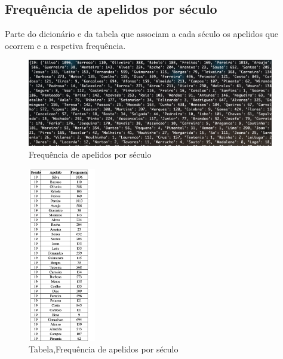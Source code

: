 \documentclass[a4paper, 12pt]{article}
\begin{document}
\subsection{Frequência de apelidos por século}
Parte do dicionário e da tabela que associam a cada século os apelidos que ocorrem e a respetiva frequência.
\begin{figure}[H]
    \centering
    \includegraphics[height=1.5in]{3.png}
    \caption{Frequência de apelidos por século}
    \label{fig:my_label}
\end{figure}
\begin{figure}[H]
    \centering
    \includegraphics[height=3in]{3-tabela.png}
    \caption{Tabela,Frequência de apelidos por século}
    \label{fig:my_label}
\end{figure}
\newpage
\end{document}
